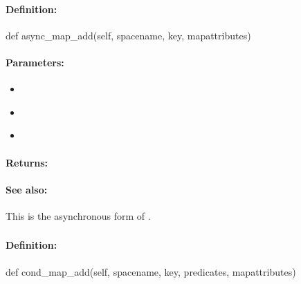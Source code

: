 \paragraph{Definition:}
\begin{pythoncode}
def async_map_add(self, spacename, key, mapattributes)
\end{pythoncode}

\paragraph{Parameters:}
\begin{itemize}[noitemsep]
\item {}\\

\item {}\\

\item {}\\

\end{itemize}

\paragraph{Returns:}


\paragraph{See also:}  This is the asynchronous form of .

\pagebreak
\subsubsection{}
\label{api:python:cond_map_add}


\paragraph{Definition:}
\begin{pythoncode}
def cond_map_add(self, spacename, key, predicates, mapattributes)
\end{pythoncode}

